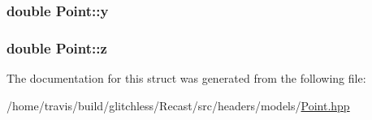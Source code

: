 \hypertarget{struct_point_afa38be143ae800e6ad69ce8ed4df62d8}{
\subsubsection[{y}]{\setlength{\rightskip}{0pt plus 5cm}double Point\-::y}}\label{struct_point_afa38be143ae800e6ad69ce8ed4df62d8}
\hypertarget{struct_point_a05ba3b1dfcb19430582ae953cbbfbded}{
\subsubsection[{z}]{\setlength{\rightskip}{0pt plus 5cm}double Point\-::z}}\label{struct_point_a05ba3b1dfcb19430582ae953cbbfbded}


The documentation for this struct was generated from the following file\-:\begin{DoxyCompactItemize}
\item 
/home/travis/build/glitchless/\-Recast/src/headers/models/\hyperlink{models_2_point_8hpp}{Point.\-hpp}\end{DoxyCompactItemize}
